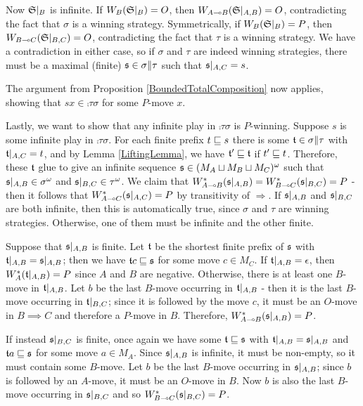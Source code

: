 \documentclass[11pt]{article} %
\begin{document}
Now $\S\vert_B$ is infinite.  If $W_B(\S\vert_B)=O$, then $W_{A\implies B}(\S\vert_{A,B})=O$, contradicting the fact that $\sigma$ is a winning strategy.  Symmetrically, if $W_B(\S\vert_B)=P$, then $W_{B\implies C}(\S\vert_{B,C})=O$, contradicting the fact that $\tau$ is a winning strategy.  We have a contradiction in either case, so if $\sigma$ and $\tau$ are indeed winning strategies, there must be a maximal (finite) $\s\in\sigma\|\tau$ such that $\s\vert_{A,C}=s$.  

The argument from Proposition \ref{BoundedTotalComposition} now applies, showing that $sx\in\comp\tau\sigma$ for some $P$-move $x$.  

Lastly, we want to show that any infinite play in $\comp\tau\sigma$ is $P$-winning.  Suppose $s$ is some infinite play in $\comp\tau\sigma$.  For each finite prefix $t\prefix s$ there is some $\t\in\sigma\|\tau$ with $\t\vert_{A,C}=t$, and by Lemma \ref{LiftingLemma}, we have $\t'\prefix\t$ if $t'\prefix t$.  Therefore, these $\t$ glue to give an infinite sequence $\s\in(M_A\cprd M_B\cprd M_C)^\omega$ such that $\s\vert_{A,B}\in\sigma^\omega$ and $\s\vert_{B,C}\in\tau^\omega$.  We claim that $W_{A\implies B}^*(\s\vert_{A,B})=W_{B\implies C}^*(\s\vert_{B,C})=P$ - then it follows that $W_{A\implies C}^*(\s\vert_{A,C})=P$ by transitivity of $\Rightarrow$.  If $\s\vert_{A,B}$ and $\s\vert_{B,C}$ are both infinite, then this is automatically true, since $\sigma$ and $\tau$ are winning strategies.  Otherwise, one of them must be infinite and the other finite.  

Suppose that $\s\vert_{A,B}$ is finite.  Let $\t$ be the shortest finite prefix of $\s$ with $\t\vert_{A,B}=\s\vert_{A,B}$; then we have $\t c\prefix \s$ for some move $c\in M_C$.  If $\t\vert_{A,B}=\emptyplay$, then $W_A^*(\t\vert_{A,B})=P$ since $A$ and $B$ are negative.  Otherwise, there is at least one $B$-move in $\t\vert_{A,B}$.  Let $b$ be the last $B$-move occurring in $\t\vert_{A,B}$ - then it is the last $B$-move occurring in $\t\vert_{B,C}$; since it is followed by the move $c$, it must be an $O$-move in $B\implies C$ and therefore a $P$-move in $B$.  Therefore, $W_{A\implies B}^*(\s\vert_{A,B})=P$.  

If instead $\s\vert_{B,C}$ is finite, once again we have some $\t\prefix\s$ with $\t\vert_{A,B}=\s\vert_{A,B}$ and $\t a\prefix\s$ for some move $a\in M_A$.  Since $\s\vert_{A,B}$ is infinite, it must be non-empty, so it must contain some $B$-move.  Let $b$ be the last $B$-move occurring in $\s\vert_{A,B}$; since $b$ is followed by an $A$-move, it must be an $O$-move in $B$.  Now $b$ is also the last $B$-move occurring in $\s\vert_{B,C}$ and so $W_{B\implies C}^*(\s\vert_{B,C})=P$.
\end{document}
